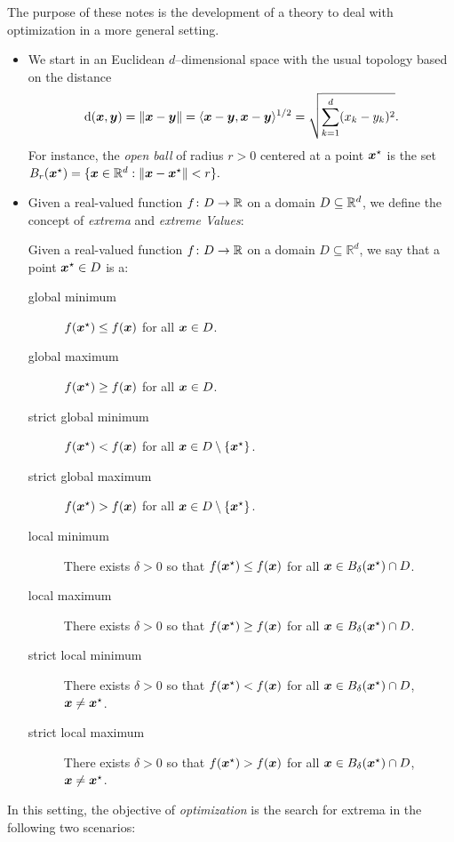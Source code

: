 The purpose of these notes is the development of a theory to deal with optimization in a more general setting.
\begin{itemize}
	\item We start in an Euclidean $d$--dimensional space with the usual topology based on the distance 
	\begin{equation*}
	\operatorname{d}(\boldsymbol{x},\boldsymbol{y})=\lVert \boldsymbol{x}-\boldsymbol{y} \rVert = \langle \boldsymbol{x}-\boldsymbol{y}, \boldsymbol{x}-\boldsymbol{y} \rangle^{1/2} = \sqrt{\sum_{k=1}^d (x_k-y_k)^2 }.
	\end{equation*}
	For instance, the \emph{open ball} of radius $r>0$ centered at a point $\boldsymbol{x}^{\star}$ is the set $B_r(\boldsymbol{x}^{\star}) = \{ \boldsymbol{x} \in \mathbb{R}^d : \lVert \boldsymbol{x}-\boldsymbol{x}^{\star} \rVert< r \}.$
	\item Given a real-valued function $f\colon D \to \mathbb{R}$ on a domain $D \subseteq \mathbb{R}^d$, we define the concept of \emph{extrema} and \emph{extreme Values}:
	\begin{definition}\label{def:extrema}
	Given a real-valued function $f\colon D \to \mathbb{R}$ on a domain $D \subseteq \mathbb{R}^d$, we say that a point $\boldsymbol{x}^{\star} \in D$ is a:
	\begin{description}
		\item [global minimum] $f(\boldsymbol{x}^{\star}) \leq f(\boldsymbol{x})$ for all $\boldsymbol{x} \in D$.
		\item [global maximum] $f(\boldsymbol{x}^{\star}) \geq f(\boldsymbol{x})$ for all $\boldsymbol{x} \in D$.
		\item [strict global minimum] $f(\boldsymbol{x}^{\star}) < f(\boldsymbol{x})$ for all $\boldsymbol{x} \in D \setminus \{ \boldsymbol{x}^{\star} \}$.
		\item [strict global maximum] $f(\boldsymbol{x}^{\star}) > f(\boldsymbol{x})$ for all $\boldsymbol{x} \in D \setminus \{ \boldsymbol{x}^{\star} \}$.
		\item [local minimum] There exists $\delta>0$ so that  $f(\boldsymbol{x}^{\star}) \leq f(\boldsymbol{x})$ for all $\boldsymbol{x} \in B_\delta(\boldsymbol{x}^{\star})\cap D$.
		\item [local maximum] There exists $\delta>0$ so that  $f(\boldsymbol{x}^{\star}) \geq f(\boldsymbol{x})$ for all $\boldsymbol{x} \in B_\delta(\boldsymbol{x}^{\star})\cap D$.
		\item [strict local minimum] There exists $\delta>0$ so that  $f(\boldsymbol{x}^{\star}) < f(\boldsymbol{x})$ for all $\boldsymbol{x} \in B_\delta(\boldsymbol{x}^{\star})\cap D$, $\boldsymbol{x} \neq \boldsymbol{x}^{\star}$.
		\item [strict local maximum] There exists $\delta>0$ so that  $f(\boldsymbol{x}^{\star}) > f(\boldsymbol{x})$ for all $\boldsymbol{x} \in B_\delta(\boldsymbol{x}^{\star})\cap D$, $\boldsymbol{x} \neq \boldsymbol{x}^{\star}$.
	\end{description}
	\end{definition}	
\end{itemize}
In this setting, the objective of \emph{optimization} is the search for extrema in the following two scenarios:
